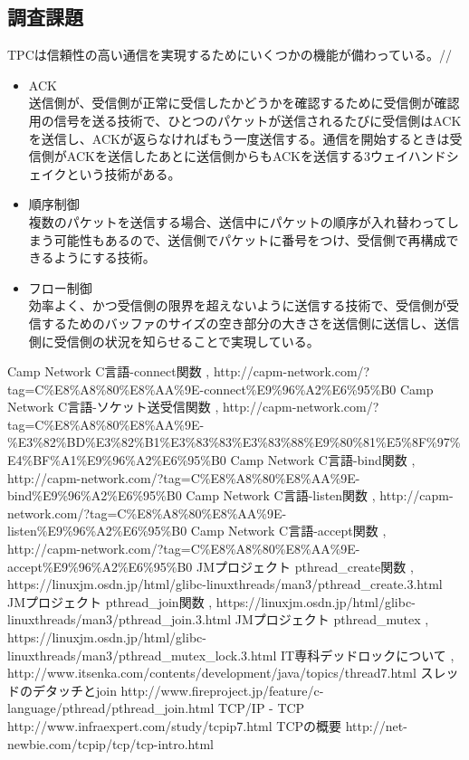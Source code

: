 \documentclass[a4j]{celb-report}
\begin{document}
\subsection{調査課題}
TPCは信頼性の高い通信を実現するためにいくつかの機能が備わっている。//
\begin{itemize}
 \item ACK\\
送信側が、受信側が正常に受信したかどうかを確認するために受信側が確認用の信号を送る技術で、ひとつのパケットが送信されるたびに受信側はACKを送信し、ACKが返らなければもう一度送信する。通信を開始するときは受信側がACKを送信したあとに送信側からもACKを送信する3ウェイハンドシェイクという技術がある。
 \item 順序制御\\
複数のパケットを送信する場合、送信中にパケットの順序が入れ替わってしまう可能性もあるので、送信側でパケットに番号をつけ、受信側で再構成できるようにする技術。
 \item フロー制御\\
効率よく、かつ受信側の限界を超えないように送信する技術で、受信側が受信するためのバッファのサイズの空き部分の大きさを送信側に送信し、送信側に受信側の状況を知らせることで実現している。
\end{itemize}
\newpage
\begin{thebibliography}{9}

 Camp Network C言語-connect関数 , http://capm-network.com/?tag=C\%E8\%A8\%80\%E8\%AA\%9E-connect\%E9\%96\%A2\%E6\%95\%B0
 Camp Network C言語-ソケット送受信関数 , http://capm-network.com/?tag=C\%E8\%A8\%80\%E8\%AA\%9E-\%E3\%82\%BD\%E3\%82\%B1\%E3\%83\%83\%E3\%83\%88\%E9\%80\%81\%E5\%8F\%97\%E4\%BF\%A1\%E9\%96\%A2\%E6\%95\%B0
 Camp Network C言語-bind関数 , http://capm-network.com/?tag=C\%E8\%A8\%80\%E8\%AA\%9E-bind\%E9\%96\%A2\%E6\%95\%B0
 Camp Network C言語-listen関数 , http://capm-network.com/?tag=C\%E8\%A8\%80\%E8\%AA\%9E-listen\%E9\%96\%A2\%E6\%95\%B0
 Camp Network C言語-accept関数 , http://capm-network.com/?tag=C\%E8\%A8\%80\%E8\%AA\%9E-accept\%E9\%96\%A2\%E6\%95\%B0
JMプロジェクト pthread\_create関数 , https://linuxjm.osdn.jp/html/glibc-linuxthreads/man3/pthread\_create.3.html
 JMプロジェクト pthread\_join関数 , https://linuxjm.osdn.jp/html/glibc-linuxthreads/man3/pthread\_join.3.html
 JMプロジェクト pthread\_mutex , https://linuxjm.osdn.jp/html/glibc-linuxthreads/man3/pthread\_mutex\_lock.3.html
 IT専科デッドロックについて , http://www.itsenka.com/contents/development/java/topics/thread7.html
 スレッドのデタッチとjoin http://www.fireproject.jp/feature/c-language/pthread/pthread\_join.html
 TCP/IP - TCP http://www.infraexpert.com/study/tcpip7.html
 TCPの概要 http://net-newbie.com/tcpip/tcp/tcp-intro.html
\end{thebibliography}
%
\end{document}
